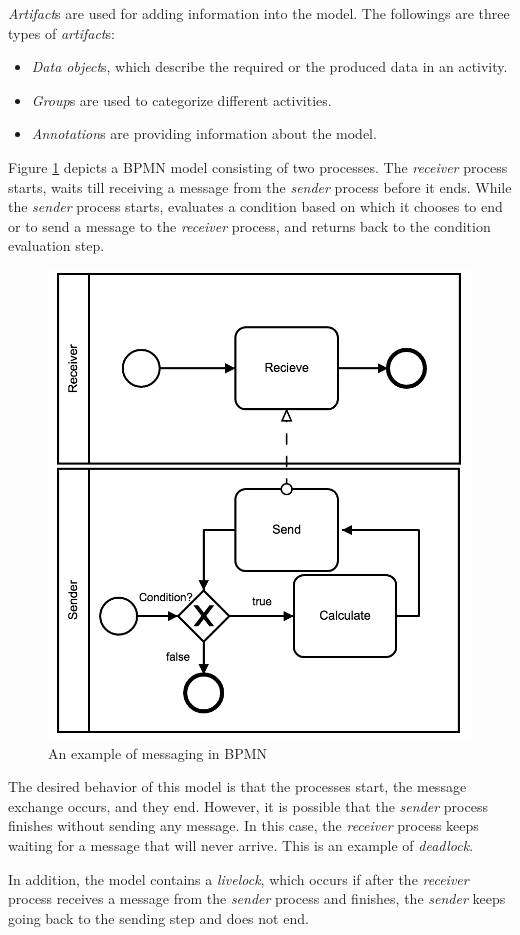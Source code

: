 \emph{Artifact}s are used for adding information into the model. The followings are three types of \emph{artifact}s:
\begin{itemize}
\item \emph{Data object}s, which describe the required or the produced  data in an activity.
\item \emph{Group}s are used to categorize different activities.
\item \emph{Annotation}s are providing information about the model.
\end{itemize}

\begin{BehExample}
Figure \ref{fig:bpmnexvisa} depicts a BPMN model consisting of two processes. The \emph{receiver} process starts, waits till receiving a message from the \emph{sender} process before it ends. While the \emph{sender} process starts, evaluates a condition based on which it chooses to end or to send a message to the \emph{receiver} process, and returns back to the condition evaluation step.

\begin{figure}[H]
\centering
\includegraphics[width=43ex]{img/runningex.png}
\caption{An example of messaging in BPMN}
\label{fig:bpmnexvisa}
\end{figure}


The desired behavior of this model is that the processes start, the message exchange occurs, and they end. However, it is possible that the \emph{sender} process finishes without sending any message. In this case,  the \emph{receiver} process keeps waiting for a message that will never arrive. This is an example of \emph{deadlock}.

In addition, the model contains a \emph{livelock}, which occurs if after the \emph{receiver} process receives a message from the \emph{sender} process and finishes, the \emph{sender} keeps going back to the sending step and does not end.
\end{BehExample}

